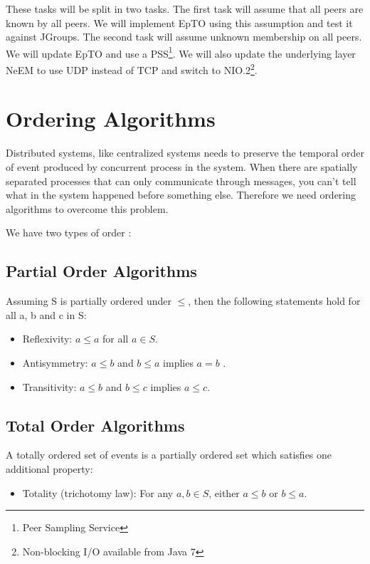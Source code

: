 \documentclass[10pt,conference,a4paper]{IEEEtran}
\begin{document}
These tasks will be split in two tasks. The first task will assume that all peers are known by all peers. We will implement EpTO using this assumption and test it against JGroups. The second task will assume unknown membership on all peers. We will update EpTO and use a PSS\footnote{Peer Sampling Service}. We will also update the underlying layer NeEM to use UDP instead of TCP and switch to NIO.2\footnote{Non-blocking I/O available from Java 7}.

\section{Ordering Algorithms}

Distributed systems, like centralized systems needs to preserve the temporal order of event produced by concurrent process in the system. When there are spatially separated processes that can only communicate through messages, you can’t tell what in the system happened before something else.
Therefore we need ordering algorithms to overcome this problem.
\par
We have two types of order \autocite{lamport1978time}:
\subsection{Partial Order Algorithms}
Assuming S is partially ordered under $\leq$, then the following statements hold for all a, b and c in S:
\begin{itemize}
	\item Reflexivity: $a \leq a$ for all $a \in S$.
	\item Antisymmetry: $a \leq b$ and $b \leq a$ implies $a=b$ .
	\item Transitivity: $a \leq b$  and $b \leq c$  implies $a \leq c$.
\end{itemize}

\subsection{Total Order Algorithms}
A totally ordered set of events is a partially ordered set which satisfies one additional property:
\begin{itemize}
	\item Totality (trichotomy law): For any $a, b \in S$, either $a \leq b$  or $b \leq a$.
\end{itemize}
\end{document}
